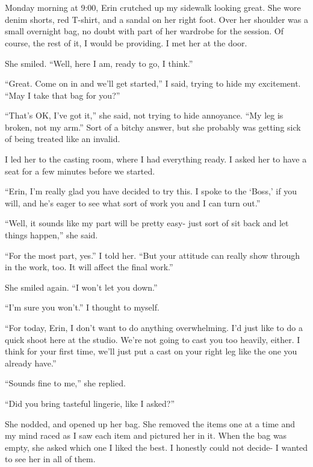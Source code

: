 \chapter{~}
Monday morning at 9:00, Erin crutched up my sidewalk looking great. She wore denim shorts,
red T-shirt, and a sandal on her right foot. Over her shoulder was a small overnight bag, no
doubt with part of her wardrobe for the session. Of course, the rest of it, I would be
providing. I met her at the door.

She smiled. ``Well, here I am, ready to go, I think.''

``Great. Come on in and we'll get started,'' I said, trying to hide my excitement. ``May I
take that bag for you?''

``That's OK, I've got it,'' she said, not trying to hide annoyance. ``My leg is broken, not
my arm.'' Sort of a bitchy answer, but she probably was getting sick of being treated like an
invalid.

I led her to the casting room, where I had everything ready. I asked her to have a seat for
a few minutes before we started.

``Erin, I'm really glad you have decided to try this. I spoke to the ‘Boss,' if you will,
and he's eager to see what sort of work you and I can turn out.''

``Well, it sounds like my part will be pretty easy- just sort of sit back and let things
happen,'' she said.

``For the most part, yes.'' I told her. ``But your attitude can really show through in the
work, too. It will affect the final work.''

She smiled again. ``I won't let you down.''

``I'm sure you won't.'' I thought to myself.

``For today, Erin, I don't want to do anything overwhelming. I'd just like to do a quick
shoot here at the studio. We're not going to cast you too heavily, either. I think for your
first time, we'll just put a cast on your right leg like the one you already have.''

``Sounds fine to me,'' she replied.

``Did you bring tasteful lingerie, like I asked?''

She nodded, and opened up her bag. She removed the items one at a time and my mind raced as
I saw each item and pictured her in it. When the bag was empty, she asked which one I liked the
best. I honestly could not decide- I wanted to see her in all of them.

